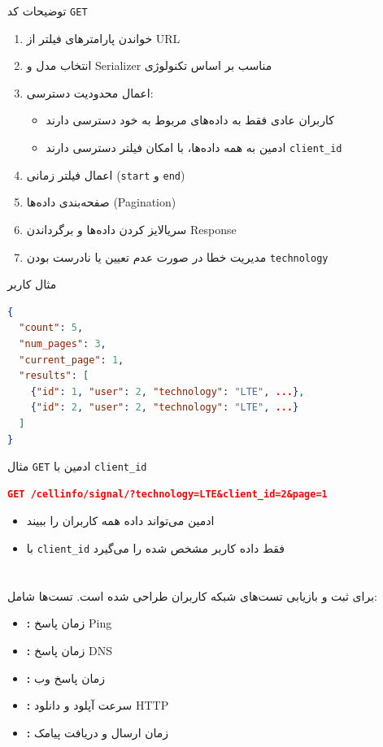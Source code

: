 \documentclass{report}
\begin{document}
توضیحات کد  \texttt{GET}
\begin{enumerate}
    \item خواندن پارامترهای فیلتر از URL
    \item انتخاب مدل و Serializer مناسب بر اساس تکنولوژی
    \item اعمال محدودیت دسترسی:
    \begin{itemize}
        \item کاربران عادی فقط به داده‌های مربوط به خود دسترسی دارند  
        \item ادمین به همه داده‌ها، با امکان فیلتر دسترسی دارند  \texttt{client\_id}
    \end{itemize}
    \item اعمال فیلتر زمانی (\texttt{start} و \texttt{end})
    \item صفحه‌بندی داده‌ها (Pagination)
    \item سریالایز کردن داده‌ها و برگرداندن Response
    \item مدیریت خطا در صورت عدم تعیین یا نادرست بودن \texttt{technology}
\end{enumerate}

مثال \texttt{} کاربر
\begin{lstlisting}[language=json]
{
  "count": 5,
  "num_pages": 3,
  "current_page": 1,
  "results": [
    {"id": 1, "user": 2, "technology": "LTE", ...},
    {"id": 2, "user": 2, "technology": "LTE", ...}
  ]
}
\end{lstlisting}

مثال \texttt{GET} ادمین با \texttt{client\_id}
\begin{lstlisting}[language=json]
GET /cellinfo/signal/?technology=LTE&client_id=2&page=1
\end{lstlisting}
\begin{itemize}
    \item ادمین می‌تواند داده همه کاربران را ببیند
    \item با \texttt{client\_id} فقط داده کاربر مشخص شده را می‌گیرد
\end{itemize}

\section{}
 برای ثبت و بازیابی تست‌های شبکه کاربران طراحی شده است. تست‌ها شامل:
\begin{itemize}
    \item \textbf{:} زمان پاسخ Ping
    \item \textbf{:} زمان پاسخ DNS
    \item \textbf{:} زمان پاسخ وب
    \item \textbf{:} سرعت آپلود و دانلود HTTP
    \item \textbf{:} زمان ارسال و دریافت پیامک
\end{itemize}
\end{document}
